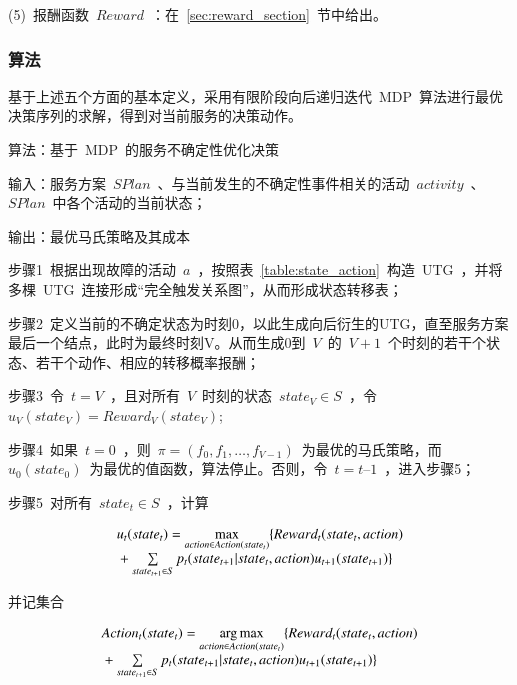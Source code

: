 (5)~报酬函数~$Reward$~：在~\ref{sec:reward_section}~节中给出。

\subsubsection{算法}

基于上述五个方面的基本定义，采用有限阶段向后递归迭代~MDP~算法进行最优决策序列的求解，得到对当前服务的决策动作。

算法：基于~MDP~的服务不确定性优化决策

输入：服务方案~$SPlan$~、与当前发生的不确定性事件相关的活动~$activity$~、
~$SPlan$~中各个活动的当前状态；

输出：最优马氏策略及其成本

步骤1~根据出现故障的活动~$a$~，按照表~\ref{table:state_action}~构造~UTG~，并将多棵~UTG~连接形成“完全触发关系图”，从而形成状态转移表；

步骤2~定义当前的不确定状态为时刻0，以此生成向后衍生的UTG，直至服务方案最后一个结点，此时为最终时刻V。从而生成0到~$V$~的~$V+1$~个时刻的若干个状态、若干个动作、相应的转移概率报酬；

步骤3~令~$t=V$~，且对所有~$V$~时刻的状态~$state_V \in S$~，令~${u_V}( {state_V} ) = Reward_V( {state_V} )$;

步骤4~如果~$t=0$~，则~$\pi  = (f_0,f_1,\ldots ,f_{V-1})$~为最优的马氏策略，而~${u_0}( state_0)$~为最优的值函数，算法停止。否则，令~$t=t–1$~，进入步骤5；

步骤5~对所有~$state_t \in S$~，计算

\begin{equation}\label{equation:backward_mdp}
\begin{array}{l}
{u_t}(stat{e_t}) = \mathop {\max }\limits_{action \in Action(stat{e_t})} \{ Rewar{d_t}(stat{e_t},action)\\
{\rm{                        }} + \sum\limits_{stat{e_{t + 1}} \in S} {{p_t}(stat{e_{t + 1}}|stat{e_t},action){u_{t + 1}}(stat{e_{t + 1}})} \} 
\end{array}
\end{equation}

并记集合

\begin{equation}\label{equation:backward_mdp_arg}
\begin{array}{l}
Actio{n_t}(stat{e_t}) = \mathop {\arg \max }\limits_{action \in Action(stat{e_t})} \{ Rewar{d_t}(stat{e_t},action)\\
{\rm{                       }} + \sum\limits_{stat{e_{t + 1}} \in S} {{p_t}(stat{e_{t + 1}}|stat{e_t},action){u_{t + 1}}(stat{e_{t + 1}})} \} 
\end{array}
\end{equation}

